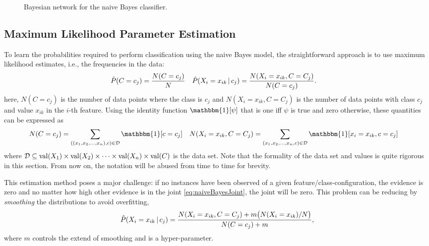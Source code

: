		\begin{figure}
			\centering
			\caption[Naive Bayes Bayesian Network]{Bayesian network for the naive Bayes classifier.}
			\label{fig:naiveBayes}
		\end{figure}

		\subsection{Maximum Likelihood Parameter Estimation}
			To learn the probabilities required to perform classification using the naive Bayes model, the straightforward approach is to use maximum likelihood estimates, i.e., the frequencies in the data:
			\begin{align}
				\hat{P}(C = c_j)                 & = \frac{N(C = c_j)}{N}                         &
				\hat{P}(X_i = x_{ik} \,\vert\, c_j) & = \frac{N(X_i = x_{ik}, C = C_j)}{N(C = c_j)}.
			\end{align}
			here, \( N(C = c_j) \) is the number of data points where the class is \(c_j\) and \( N(X_i = x_{ik}, C = C_j) \) is the number of data points with class \( c_j \) and value \(x_{ik}\) in the \(i\)-th feature. Using the identity function \(\mathbbm{1}[\psi]\) that is one iff \(\psi\) is true and zero otherwise, these quantities can be expressed as
			\begin{align}
				N(C = c_j)               & = \sum_{((x_1, x_2, \dots, x_n), c) \in \mathcal{D}} \mathbbm{1}[c = c_j]             &
				N(X_i = x_{ik}, C = C_j) & = \sum_{(x_1, x_2, \dots, x_n, c) \in \mathcal{D}} \mathbbm{1}[x_i = x_{ik}, c = c_j]
			\end{align}
			where \( \mathcal{D} \subseteq \operatorname{val}(X_1) \times \operatorname{val}(X_2) \times \dots \times \operatorname{val}(X_n) \times \operatorname{val}(C) \) is the data set. Note that the formality of the data set and values is quite rigorous in this section. From now on, the notation will be abused from time to time for brevity.

			This estimation method poses a major challenge: if no instances have been observed of a given feature/class-configuration, the evidence is zero and no matter how high other evidence is in the joint \eqref{eq:naiveBayesJoint}, the joint will be zero. This problem can be reducing by \emph{smoothing} the distributions to avoid overfitting,
			\begin{equation}
				\hat{P}(X_i = x_{ik} \,\vert\, c_j) = \frac{N(X_i = x_{ik}, C = C_j) + m \bigl( N(X_i = x_{ik}) / N \bigr)}{N(C = c_j) + m},
			\end{equation}
			where \(m\) controls the extend of smoothing and is a hyper-parameter.

